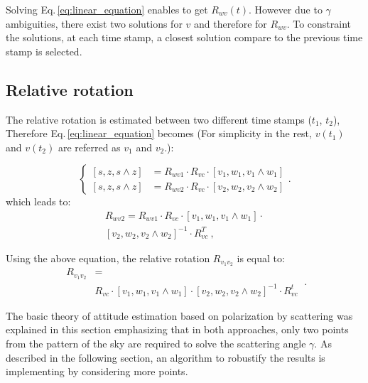 Solving Eq.\,\eqref{eq:linear_equation} enables to get $R_{wv}(t)$. However due to
$\gamma$ ambiguities, there exist two solutions for $v$ and therefore for
$R_{wv}$.
To constraint the solutions, at each time stamp, a closest solution compare to
the previous time stamp is selected.



\subsection{Relative rotation}
\label{sec:rel-rot}

The relative rotation is estimated between two different time stamps ($t_1$,
$t_2$), Therefore Eq.\,\eqref{eq:linear_equation} becomes (For simplicity in the
rest, $v(t_1)$ and $v(t_2)$ are referred as $v_1$ and $v_2$.):

\begin{equation}
\begin{cases}
\left[s,z,s\wedge z\right] & =R_{wv1}\cdot R_{vc}\cdot\left[v_{1},w_{1},v_{1}\wedge w_{1}\right]\\
\left[s,z,s\wedge z\right] & =R_{wv2}\cdot R_{vc}\cdot\left[v_{2},w_{2},v_{2}\wedge w_{2}\right]
\end{cases}.
\label{eq:rel-linear_equation}
\end{equation}
\noindent which leads to:
\begin{equation}
  \begin{split}
R_{wv2}=R_{wv1}\cdot R_{vc}\cdot\left[v_{1},w_{1},v_{1}\wedge
  w_{1}\right]\cdot \\
\left[v_{2},w_{2},v_{2}\wedge w_{2}\right]^{-1} \cdot R_{vc}^{T} \ ,
\label{eq:relative_equation}\end{split}
\end{equation}

Using the above equation, the relative rotation $R_{v_{1}v_{2}}$ is equal to:
\begin{equation}
\begin{split}
  R_{v_{1}v_{2}} &= \\
   & R_{vc}\cdot\left[v_{1},w_{1},v_{1}\wedge
  w_{1}\right]\cdot\left[v_{2},w_{2},v_{2}\wedge w_{2}\right]^{-1}\cdot
R_{vc}^{t}
\end{split} \ .
\label{eq:final-relative}
\end{equation}


The basic theory of attitude estimation based on polarization by scattering was explained in this
section emphasizing that in both approaches, only two points from the pattern of the sky are required
to solve the scattering angle $\gamma$. As described in the following section, an algorithm to robustify 
the results is implementing by considering more points.





